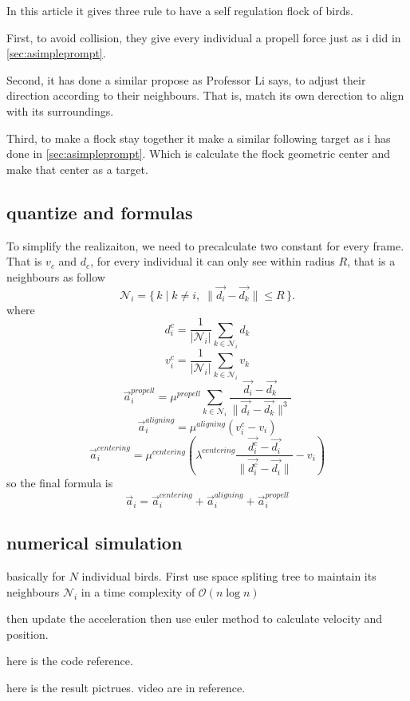 \documentclass{article}
\theoremstyle{definition} %
\begin{document}
In this article it gives three rule to
have a self regulation flock of birds.

First, to avoid collision, they give every
individual a propell force just as i did in
\ref{sec:asimpleprompt}.

Second, it has done a similar propose as
Professor Li says, to adjust their direction
according to their neighbours. That is, match
its own derection to align with its surroundings.

Third, to make a flock stay together it make a similar
following target as i has done in \ref{sec:asimpleprompt}.
Which is calculate the flock geometric center and
make that center as a target.

\subsection{quantize and formulas}
To simplify the realizaiton, we need to precalculate
two constant for every frame.
That is \(v_c\) and \(d_c\), for every individual
it can only see within radius \(R\), that is a neighbours as
follow
\[
    \mathcal{N}_i = \{\, k \;\big|\; k\neq i,\;\|\vec{d_i}-\vec{d_k}\|\leq R \,\}.
\]
where
\[
    d^c_i = \frac{1}{|\mathcal{N}_i|} \sum_{k \in \mathcal{N}_i} d_k
\]
\[
    v^c_i = \frac{1}{|\mathcal{N}_i|} \sum_{k \in \mathcal{N}_i} v_k
\]
\[
    \vec{a}_i^{propell}=\mu^{propell}\sum_{k \in \mathcal{N}_i} \frac{\vec{d_i}-\vec{d_k}}{\|\vec{d_i}-\vec{d_k}\|^3}
\]
\[
    \vec{a}_i^{aligning}=\mu^{aligning}(v_i^c-v_i)
\]
\[
    \vec{a}_i^{centering}=\mu^{centering}(\lambda^{centering}\frac{\vec{d^c_i}-\vec{d_i}}{\|\vec{d^c_i}-\vec{d_i}\|}-v_i)
\]
so the final formula is
\[
    \vec{a}_i=\vec{a}_i^{centering}+\vec{a}_i^{aligning}+\vec{a}_i^{propell}
\]

\subsection{numerical simulation}
basically for \(N\) individual birds.
First use space spliting tree to maintain
its neighbours \(\mathcal{N}_i\) in a time complexity of
\(\mathcal{O}(n \log n)\)

then update the acceleration then use euler method to calculate
velocity and position.

here is the code reference.

here is the result pictrues.
video are in reference.

\end{document}
